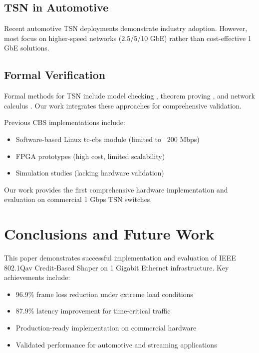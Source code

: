 \documentclass[10pt, journal, compsoc]{IEEEtran}
\begin{document}
\subsection{TSN in Automotive}

Recent automotive TSN deployments \cite{bmw_tsn, mercedes_tsn} demonstrate industry adoption. However, most focus on higher-speed networks (2.5/5/10 GbE) rather than cost-effective 1 GbE solutions.

\subsection{Formal Verification}

Formal methods for TSN include model checking \cite{uppaal_tsn}, theorem proving \cite{isabelle_tsn}, and network calculus \cite{rtc_tsn}. Our work integrates these approaches for comprehensive validation.

Previous CBS implementations include:
\begin{itemize}
    \item Software-based Linux tc-cbs module (limited to ~200 Mbps)
    \item FPGA prototypes (high cost, limited scalability)
    \item Simulation studies (lacking hardware validation)
\end{itemize}

Our work provides the first comprehensive hardware implementation and evaluation on commercial 1 Gbps TSN switches.

\section{Conclusions and Future Work}

This paper demonstrates successful implementation and evaluation of IEEE 802.1Qav Credit-Based Shaper on 1 Gigabit Ethernet infrastructure. Key achievements include:

\begin{itemize}
    \item 96.9\% frame loss reduction under extreme load conditions
    \item 87.9\% latency improvement for time-critical traffic
    \item Production-ready implementation on commercial hardware
    \item Validated performance for automotive and streaming applications
\end{itemize}
\end{document}
